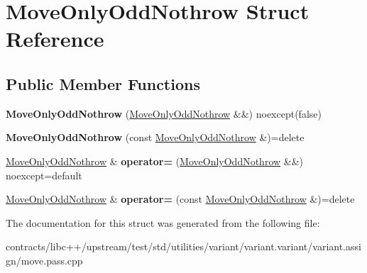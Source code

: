 \hypertarget{struct_move_only_odd_nothrow}{}\section{Move\+Only\+Odd\+Nothrow Struct Reference}
\label{struct_move_only_odd_nothrow}
\subsection*{Public Member Functions}
\begin{DoxyCompactItemize}
\item 
\mbox{\label{struct_move_only_odd_nothrow_acef68c02aa72c42e1edaacc4563a9c54}} 
{\bfseries Move\+Only\+Odd\+Nothrow} (\mbox{\hyperlink{struct_move_only_odd_nothrow}{Move\+Only\+Odd\+Nothrow}} \&\&) noexcept(false)
\item 
\mbox{\label{struct_move_only_odd_nothrow_a18b88e19bfeb77562a7bf1b2eb851612}} 
{\bfseries Move\+Only\+Odd\+Nothrow} (const \mbox{\hyperlink{struct_move_only_odd_nothrow}{Move\+Only\+Odd\+Nothrow}} \&)=delete
\item 
\mbox{\label{struct_move_only_odd_nothrow_a603d8af3ace2ba87f6b379dd4cedc6ae}} 
\mbox{\hyperlink{struct_move_only_odd_nothrow}{Move\+Only\+Odd\+Nothrow}} \& {\bfseries operator=} (\mbox{\hyperlink{struct_move_only_odd_nothrow}{Move\+Only\+Odd\+Nothrow}} \&\&) noexcept=default
\item 
\mbox{\label{struct_move_only_odd_nothrow_ad6fd20ed0bff929081d32c518bfbd02c}} 
\mbox{\hyperlink{struct_move_only_odd_nothrow}{Move\+Only\+Odd\+Nothrow}} \& {\bfseries operator=} (const \mbox{\hyperlink{struct_move_only_odd_nothrow}{Move\+Only\+Odd\+Nothrow}} \&)=delete
\end{DoxyCompactItemize}


The documentation for this struct was generated from the following file\+:\begin{DoxyCompactItemize}
\item 
contracts/libc++/upstream/test/std/utilities/variant/variant.\+variant/variant.\+assign/move.\+pass.\+cpp\end{DoxyCompactItemize}
